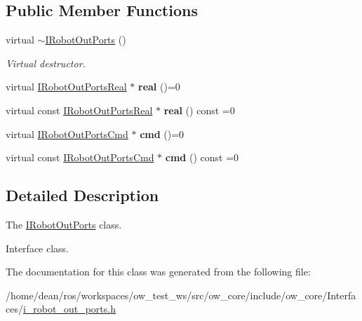 \subsection*{Public Member Functions}
\begin{DoxyCompactItemize}
\item 
virtual \hyperlink{classow__core_1_1IRobotOutPorts_a9bbe52128f66b50c0b9b3859abbdebaa}{$\sim$\+I\+Robot\+Out\+Ports} ()\hypertarget{classow__core_1_1IRobotOutPorts_a9bbe52128f66b50c0b9b3859abbdebaa}{}\label{classow__core_1_1IRobotOutPorts_a9bbe52128f66b50c0b9b3859abbdebaa}

\begin{DoxyCompactList}\small\item\em Virtual destructor. \end{DoxyCompactList}\item 
virtual \hyperlink{classow__core_1_1IRobotOutPortsReal}{I\+Robot\+Out\+Ports\+Real} $\ast$ {\bfseries real} ()=0\hypertarget{classow__core_1_1IRobotOutPorts_a79a79d009b41a67c6b471e3d4d57d341}{}\label{classow__core_1_1IRobotOutPorts_a79a79d009b41a67c6b471e3d4d57d341}

\item 
virtual const \hyperlink{classow__core_1_1IRobotOutPortsReal}{I\+Robot\+Out\+Ports\+Real} $\ast$ {\bfseries real} () const =0\hypertarget{classow__core_1_1IRobotOutPorts_af5d9270760417b332147e9239094b595}{}\label{classow__core_1_1IRobotOutPorts_af5d9270760417b332147e9239094b595}

\item 
virtual \hyperlink{classow__core_1_1IRobotOutPortsCmd}{I\+Robot\+Out\+Ports\+Cmd} $\ast$ {\bfseries cmd} ()=0\hypertarget{classow__core_1_1IRobotOutPorts_a876b27868b7bd548aec6823820dbb37a}{}\label{classow__core_1_1IRobotOutPorts_a876b27868b7bd548aec6823820dbb37a}

\item 
virtual const \hyperlink{classow__core_1_1IRobotOutPortsCmd}{I\+Robot\+Out\+Ports\+Cmd} $\ast$ {\bfseries cmd} () const =0\hypertarget{classow__core_1_1IRobotOutPorts_ac086ad94f86fcb4c7eb16dc2daeef96d}{}\label{classow__core_1_1IRobotOutPorts_ac086ad94f86fcb4c7eb16dc2daeef96d}

\end{DoxyCompactItemize}


\subsection{Detailed Description}
The \hyperlink{classow__core_1_1IRobotOutPorts}{I\+Robot\+Out\+Ports} class. 

Interface class. 

The documentation for this class was generated from the following file\+:\begin{DoxyCompactItemize}
\item 
/home/dean/ros/workspaces/ow\+\_\+test\+\_\+ws/src/ow\+\_\+core/include/ow\+\_\+core/\+Interfaces/\hyperlink{i__robot__out__ports_8h}{i\+\_\+robot\+\_\+out\+\_\+ports.\+h}\end{DoxyCompactItemize}
